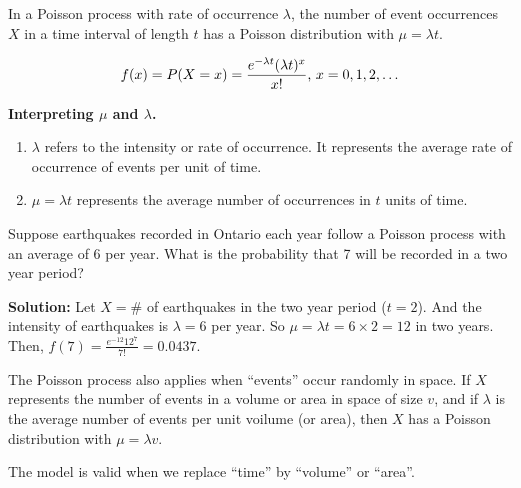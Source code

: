 In a Poisson process with rate of occurrence $\lambda$, the number of event occurrences $X$ in a time interval of length $t$
has a Poisson distribution with $\mu = \lambda t$.

\[f(x) = P(X=x) = \displaystyle \frac{e^{-\lambda t} (\lambda t)^x}{x!} \text{, $x=0,1,2,\ldots$}\]


\textbf{Interpreting $\mu$ and $\lambda$.}
\begin{enumerate}
    \item $\lambda$ refers to the intensity or rate of occurrence. It represents the average rate of occurrence of events per unit of time.
    \item $\mu = \lambda t$ represents the average number of occurrences in $t$ units of time. \\
\end{enumerate}


\begin{example}
    Suppose earthquakes recorded in Ontario each year follow a Poisson process with an average of 6 per year.
    What is the probability that 7 will be recorded in a two year period?

    \textbf{Solution:} Let $X = \#$ of earthquakes in the two year period ($t = 2$). And the intensity of earthquakes is $\lambda = 6$ per year.
    So $\mu = \lambda t = 6 \times 2 = 12$ in two years. Then, $f(7) = \frac{e^{-12} 12^7}{7!} = 0.0437$. \\
\end{example}


The Poisson process also applies when ``events'' occur randomly in space. If $X$ represents the number of events in a volume or area in space of size $v$,
and if $\lambda$ is the average number of events per unit voilume (or area), then $X$ has a Poisson distribution with $\mu = \lambda v$.

The model is valid when we replace ``time'' by ``volume'' or ``area''.

\pagebreak

